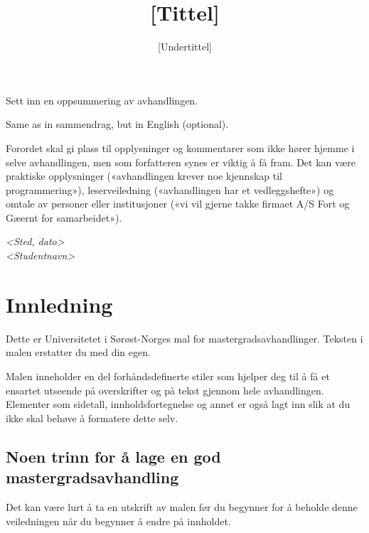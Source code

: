 \documentclass{USN-MSc}
\title{[Tittel]}
\subtitle{[Undertittel]}
\begin{document}
\USNcover



Sett inn en oppsummering av avhandlingen.


Same as in sammendrag, but in English (optional).

\tableofcontents


Forordet skal gi plass til opplysninger og kommentarer som ikke hører hjemme i
selve avhandlingen, men som forfatteren synes er viktig å få fram. Det kan
være praktiske opplysninger («avhandlingen krever noe kjennskap til
programmering»), leserveiledning («avhandlingen har et vedleggshefte») og
omtale av personer eller institusjoner («vi vil gjerne takke firmaet A/S Fort
og Gæernt for samarbeidet»).

\bigskip
\noindent\textit{<Sted, dato>}\\
\textit{<Studentnavn>}

\section{Innledning}

Dette er Universitetet i Sørøst-Norges mal for mastergradsavhandlinger. Teksten
i malen erstatter du med din egen.

Malen inneholder en del forhåndsdefinerte stiler som hjelper deg til å få et
ensartet utseende på overskrifter og på tekst gjennom hele avhandlingen.
Elementer som sidetall, innholdsfortegnelse og annet er også lagt inn slik at
du ikke skal behøve å formatere dette selv.

\subsection{Noen trinn for å lage en god mastergradsavhandling}

Det kan være lurt å ta en utskrift av malen før du begynner for å beholde
denne veiledningen når du begynner å endre på innholdet.
\end{document}

